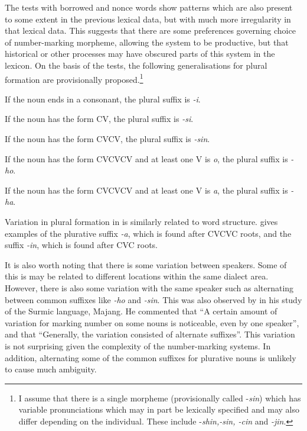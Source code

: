 \documentclass[output=paper]{langsci/langscibook}
\begin{document}
The tests with borrowed and nonce words show patterns which are also present to some extent in the previous lexical data, but with much more irregularity in that lexical data. This suggests that there are some preferences governing choice of number-marking morpheme, allowing the system to be productive, but that historical or other processes may have obscured parts of this system in the  lexicon. On the basis of the tests, the following generalisations for plural formation are provisionally proposed.\footnote{I assume that there is a single morpheme (provisionally called -\textit{sin}) which has variable pronunciations which may in part be lexically specified and may also differ depending on the individual. These include -\textit{shin,-sin, -cin }and \textit{-jin}.}

\ea\label{ex:moodie:3} If the noun ends in a consonant, the plural suffix is \textit{-i}.

If the noun has the form CV, the plural suffix is \textit{-si}. 

If the noun has the form CVCV, the plural suffix is \textit{-sin}. 

If the noun has the form CVCVCV and at least one V is\textit{ o}, the plural suffix is \textit{-ho}. 

If the noun has the form CVCVCV and at least one V is \textit{a}, the plural suffix is \textit{-ha}. 
\z

Variation in plural formation in  is similarly related to word structure. \citet[235]{Dimmendaal2000} gives examples of the plurative suffix \textit{-a}, which is found after CVCVC roots, and the suffix \textit{-in}, which is found after CVC roots. 

\largerpage
It is also worth noting that there is some variation between speakers. Some of this is may be related to different locations within the same dialect area. However, there is also some variation with the same speaker such as alternating between common suffixes like \textit{-ho} and \textit{-sin}. This was also observed by \citet[76]{Unseth1988} in his study of the  Surmic language, Majang. He commented that “A certain amount of variation for marking number on some nouns is noticeable, even by one speaker”, and that “Generally, the variation consisted of alternate suffixes”. This variation is not surprising given the complexity of the number-marking systems. In addition, alternating some of the common suffixes for plurative nouns is unlikely to cause much ambiguity.
\end{document}
